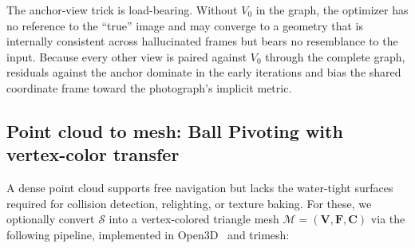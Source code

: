 \documentclass{article}
\begin{document}
The anchor-view trick is load-bearing. Without $V_0$ in the graph, the
optimizer has no reference to the ``true'' image and may converge to a
geometry that is internally consistent across hallucinated frames but
bears no resemblance to the input. Because every other view is paired
against $V_0$ through the complete graph, residuals against the anchor
dominate in the early iterations and bias the shared coordinate frame
toward the photograph's implicit metric.

\subsection{Point cloud to mesh: Ball Pivoting with vertex-color transfer}
\label{sec:method-mesh}

A dense point cloud supports free navigation but lacks the water-tight
surfaces required for collision detection, relighting, or texture
baking. For these, we optionally convert $\mathcal{S}$ into a
vertex-colored triangle mesh $\mathcal{M} = (\mathbf{V}, \mathbf{F},
\mathbf{C})$ via the following pipeline, implemented in
Open3D~\cite{open3d} and trimesh:
\end{document}
